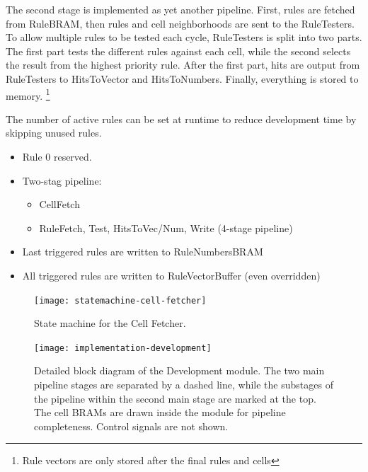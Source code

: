 The second stage is implemented as yet another pipeline.
First, rules are fetched from RuleBRAM, then rules and cell neighborhoods are sent to the RuleTesters.
To allow multiple rules to be tested each cycle, RuleTesters is split into two parts.
The first part tests the different rules against each cell, while the second selects the result from the highest priority rule.
After the first part, hits are output from RuleTesters to HitsToVector and HitsToNumbers.
Finally, everything is stored to memory.
\footnote{Rule vectors are only stored after the final rules and cells}

The number of active rules can be set at runtime to reduce development time by skipping unused rules.
\TODO
{}

\begin{itemize}
    \item Rule 0 reserved.
    \item Two-stag pipeline:
    \begin{itemize}
        \item CellFetch
        \item RuleFetch, Test, HitsToVec/Num, Write (4-stage pipeline)
    \end{itemize}
    \item Last triggered rules are written to RuleNumbersBRAM
    \item All triggered rules are written to RuleVectorBuffer (even overridden)
\end{itemize}

\begin{figure}[!ht]
    \centering
    \texttt{[image: statemachine-cell-fetcher]}
    \caption[Cell Fetcher state machine]{
        State machine for the Cell Fetcher.
    }
    \label{fig:implementation-cell-fetcher}
\end{figure}

\begin{figure}[!ht]
    \centering
    \texttt{[image: implementation-development]}
    \caption[Development module]{
        Detailed block diagram of the Development module.
        The two main pipeline stages are separated by a dashed line,
        while the substages of the pipeline within the second main stage are marked at the top.
        The cell BRAMs are drawn inside the module for pipeline completeness.
        Control signals are not shown.
    }
    \label{fig:implementation-development}
\end{figure}

